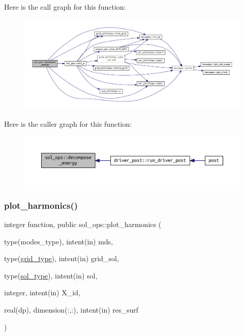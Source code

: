 Here is the call graph for this function\+:\nopagebreak
\begin{figure}[H]
\begin{center}
\leavevmode
\includegraphics[width=350pt]{namespacesol__ops_aee487ffbe5d0edff5e37a6500748941c_cgraph}
\end{center}
\end{figure}
Here is the caller graph for this function\+:\nopagebreak
\begin{figure}[H]
\begin{center}
\leavevmode
\includegraphics[width=350pt]{namespacesol__ops_aee487ffbe5d0edff5e37a6500748941c_icgraph}
\end{center}
\end{figure}
\mbox{\label{namespacesol__ops_a5cec8571480fbc319e7987732fd5995c}} 
\subsubsection{\texorpdfstring{plot\+\_\+harmonics()}{plot\_harmonics()}}
{\footnotesize\ttfamily integer function, public sol\+\_\+ops\+::plot\+\_\+harmonics (\begin{DoxyParamCaption}\item[{type(modes\+\_\+type), intent(in)}]{mds,  }\item[{type(\hyperlink{structgrid__vars_1_1grid__type}{grid\+\_\+type}), intent(in)}]{grid\+\_\+sol,  }\item[{type(\hyperlink{structsol__vars_1_1sol__type}{sol\+\_\+type}), intent(in)}]{sol,  }\item[{integer, intent(in)}]{X\+\_\+id,  }\item[{real(dp), dimension(\+:,\+:), intent(in)}]{res\+\_\+surf }\end{DoxyParamCaption})}



